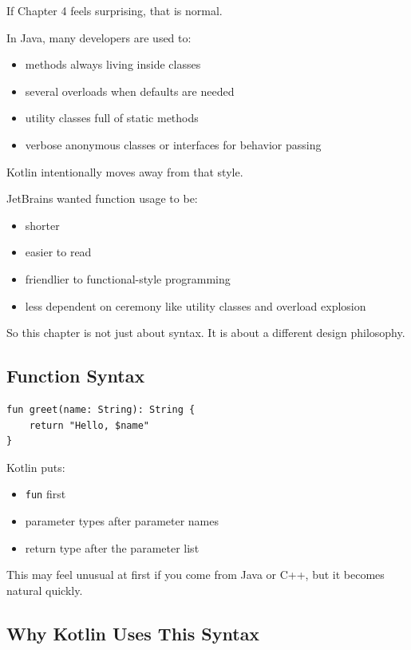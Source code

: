 \documentclass[11pt,a4paper]{article}
\begin{document}
If Chapter 4 feels surprising, that is normal.

In Java, many developers are used to:
\begin{itemize}
    \item methods always living inside classes
    \item several overloads when defaults are needed
    \item utility classes full of static methods
    \item verbose anonymous classes or interfaces for behavior passing
\end{itemize}

Kotlin intentionally moves away from that style.

JetBrains wanted function usage to be:
\begin{itemize}
    \item shorter
    \item easier to read
    \item friendlier to functional-style programming
    \item less dependent on ceremony like utility classes and overload explosion
\end{itemize}

So this chapter is not just about syntax. It is about a different design philosophy.

\subsection{Function Syntax}

\begin{lstlisting}[style=kazekotlin]
fun greet(name: String): String {
    return "Hello, $name"
}
\end{lstlisting}

Kotlin puts:
\begin{itemize}
    \item \texttt{fun} first
    \item parameter types after parameter names
    \item return type after the parameter list
\end{itemize}

This may feel unusual at first if you come from Java or C++, but it becomes natural quickly.

\subsection{Why Kotlin Uses This Syntax}
\end{document}
